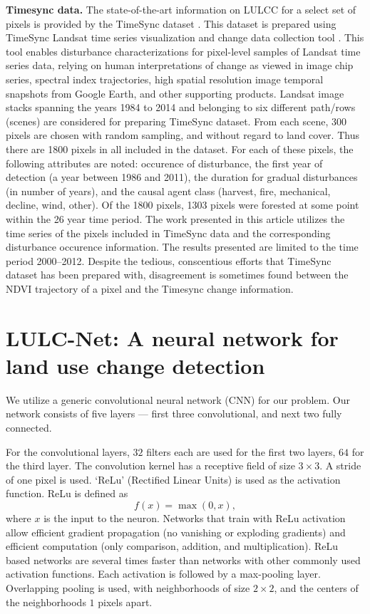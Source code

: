 \documentclass[a4paper,11pt]{article}
\begin{document}
{\bf Timesync data.} The state-of-the-art information on LULCC for a select
set of pixels is provided by the TimeSync dataset \cite{timeSync}.
This dataset is prepared using TimeSync Landsat time series 
visualization and change data collection tool \cite{timeSync}. This tool
enables disturbance characterizations for pixel-level samples of Landsat
time series data, relying on human interpretations of change as viewed
in image chip series, spectral index trajectories, high spatial resolution
image temporal snapshots from Google Earth, and other supporting products. 
Landsat image stacks spanning the years 1984 to 2014 and belonging to six
different path/rows (scenes) are considered for preparing TimeSync dataset.
From each scene, 300 pixels are chosen with random sampling, and without
regard to land cover. Thus there are 1800 pixels in all included in the 
dataset. For each of these pixels, the following attributes are noted:
occurence of disturbance, the first year of detection (a year between 1986
and 2011), the duration for gradual disturbances (in number of years), and
the causal agent class (harvest, fire, mechanical, decline, wind, other).
Of the 1800 pixels, 1303 pixels were forested at some point within the
26 year time period.
The work presented in this article utilizes the time series of the 
pixels included in TimeSync data and the corresponding disturbance 
occurence information.
The results presented are limited to the time period 2000--2012.
Despite the tedious, conscentious efforts that TimeSync dataset has
been prepared with, disagreement is sometimes found between the NDVI 
trajectory of a pixel and the Timesync change information. 

\section{LULC-Net: A neural network for land use change detection}
We utilize a generic convolutional neural network (CNN)
for our problem. Our network consists of five layers --- first three 
convolutional, and next two fully connected. 

For the convolutional layers, $32$ filters each are used for the first
two layers, $64$ for the third layer. The convolution kernel has a
receptive field of size $3\times 3$. A stride of one pixel is used.
`ReLu' (Rectified Linear Units) is used as the activation function. ReLu
is defined as $$ f(x) = \max(0, x),$$
where $x$ is the input to the neuron. Networks that train with ReLu activation
allow efficient gradient propagation (no vanishing or exploding gradients)
and efficient computation (only comparison, addition, and 
multiplication). ReLu based networks are several times faster than networks
with other commonly used activation functions.
Each activation is followed by a max-pooling layer. Overlapping
pooling is used, with neighborhoods of size $2\times 2$,
and the centers of the neighborhoods $1$ pixels apart. 
\end{document}
